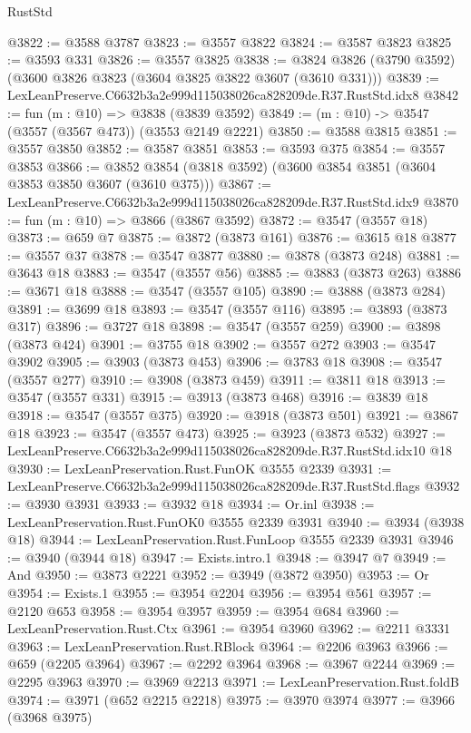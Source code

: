 \begin{lexlean}{RustStd}
\begin{coremodule}
@3822 := @3588 @3787
@3823 := @3557 @3822
@3824 := @3587 @3823
@3825 := @3593 @331
@3826 := @3557 @3825
@3838 := @3824 @3826 (@3790 @3592) (@3600 @3826 @3823 (@3604 @3825 @3822 @3607 (@3610 @331)))
@3839 := LexLeanPreserve.C6632b3a2e999d115038026ca828209de.R37.RustStd.idx8
@3842 := fun (m : @10) => @3838 (@3839 @3592)
@3849 := (m : @10) -> @3547 (@3557 (@3567 @473)) (@3553 @2149 @2221)
@3850 := @3588 @3815
@3851 := @3557 @3850
@3852 := @3587 @3851
@3853 := @3593 @375
@3854 := @3557 @3853
@3866 := @3852 @3854 (@3818 @3592) (@3600 @3854 @3851 (@3604 @3853 @3850 @3607 (@3610 @375)))
@3867 := LexLeanPreserve.C6632b3a2e999d115038026ca828209de.R37.RustStd.idx9
@3870 := fun (m : @10) => @3866 (@3867 @3592)
@3872 := @3547 (@3557 @18)
@3873 := @659 @7
@3875 := @3872 (@3873 @161)
@3876 := @3615 @18
@3877 := @3557 @37
@3878 := @3547 @3877
@3880 := @3878 (@3873 @248)
@3881 := @3643 @18
@3883 := @3547 (@3557 @56)
@3885 := @3883 (@3873 @263)
@3886 := @3671 @18
@3888 := @3547 (@3557 @105)
@3890 := @3888 (@3873 @284)
@3891 := @3699 @18
@3893 := @3547 (@3557 @116)
@3895 := @3893 (@3873 @317)
@3896 := @3727 @18
@3898 := @3547 (@3557 @259)
@3900 := @3898 (@3873 @424)
@3901 := @3755 @18
@3902 := @3557 @272
@3903 := @3547 @3902
@3905 := @3903 (@3873 @453)
@3906 := @3783 @18
@3908 := @3547 (@3557 @277)
@3910 := @3908 (@3873 @459)
@3911 := @3811 @18
@3913 := @3547 (@3557 @331)
@3915 := @3913 (@3873 @468)
@3916 := @3839 @18
@3918 := @3547 (@3557 @375)
@3920 := @3918 (@3873 @501)
@3921 := @3867 @18
@3923 := @3547 (@3557 @473)
@3925 := @3923 (@3873 @532)
@3927 := LexLeanPreserve.C6632b3a2e999d115038026ca828209de.R37.RustStd.idx10 @18
@3930 := LexLeanPreservation.Rust.FunOK @3555 @2339
@3931 := LexLeanPreserve.C6632b3a2e999d115038026ca828209de.R37.RustStd.flags
@3932 := @3930 @3931
@3933 := @3932 @18
@3934 := Or.inl
@3938 := LexLeanPreservation.Rust.FunOK0 @3555 @2339 @3931
@3940 := @3934 (@3938 @18)
@3944 := LexLeanPreservation.Rust.FunLoop @3555 @2339 @3931
@3946 := @3940 (@3944 @18)
@3947 := Exists.intro.{1}
@3948 := @3947 @7
@3949 := And
@3950 := @3873 @2221
@3952 := @3949 (@3872 @3950)
@3953 := Or
@3954 := Exists.{1}
@3955 := @3954 @2204
@3956 := @3954 @561
@3957 := @2120 @653
@3958 := @3954 @3957
@3959 := @3954 @684
@3960 := LexLeanPreservation.Rust.Ctx
@3961 := @3954 @3960
@3962 := @2211 @3331
@3963 := LexLeanPreservation.Rust.RBlock
@3964 := @2206 @3963
@3966 := @659 (@2205 @3964)
@3967 := @2292 @3964
@3968 := @3967 @2244
@3969 := @2295 @3963
@3970 := @3969 @2213
@3971 := LexLeanPreservation.Rust.foldB
@3974 := @3971 (@652 @2215 @2218)
@3975 := @3970 @3974
@3977 := @3966 (@3968 @3975)

\end{coremodule}
\end{lexlean}
